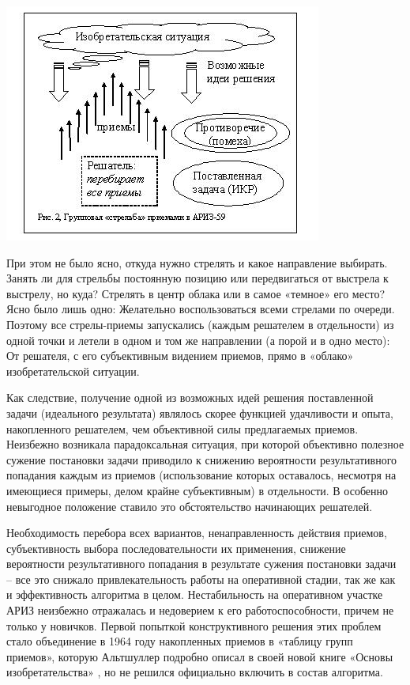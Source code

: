 \documentclass[11pt,a4paper]{article}
\begin{document}
\begin{center}
  \includegraphics[width=.7\textwidth]{./9.jpg}
\end{center}

При этом не было ясно, откуда нужно стрелять и какое направление выбирать.
Занять ли для стрельбы постоянную позицию или передвигаться от выстрела к
выстрелу, но куда? Стрелять в центр облака или в самое «темное» его место?
Ясно было лишь одно: Желательно воспользоваться всеми стрелами по очереди.
Поэтому все стрелы-приемы запускались (каждым решателем в отдельности) из
одной точки и летели в одном и том же направлении (а порой и в одно место): От
решателя, с его субъективным видением приемов, прямо в «облако»
изобретательской ситуации.

Как следствие, получение одной из возможных идей решения поставленной задачи
(идеального результата) являлось скорее функцией удачливости и опыта,
накопленного решателем, чем объективной силы предлагаемых приемов. Неизбежно
возникала парадоксальная ситуация, при которой объективно полезное сужение
постановки задачи приводило к снижению вероятности результативного попадания
каждым из приемов (использование которых оставалось, несмотря на имеющиеся
примеры, делом крайне субъективным) в отдельности. В особенно невыгодное
положение ставило это обстоятельство начинающих решателей.

Необходимость перебора всех вариантов, ненаправленность действия приемов,
субъективность выбора последовательности их применения, снижение вероятности
результативного попадания в результате сужения постановки задачи -- все это
снижало привлекательность работы на оперативной стадии, так же как и
эффективность алгоритма в целом. Нестабильность на оперативном участке АРИЗ
неизбежно отражалась и недоверием к его работоспособности, причем не только у
новичков. Первой попыткой конструктивного решения этих проблем стало
объединение в 1964 году накопленных приемов в «таблицу групп приемов», которую
Альтшуллер подробно описал в своей новой книге «Основы изобретательства»
\cite{Altshuller1964}, но не решился официально включить в состав алгоритма.



\end{document}
